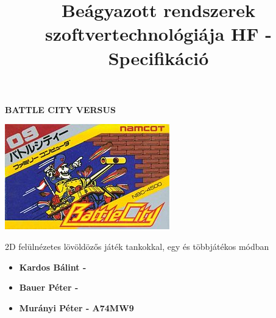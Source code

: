 \documentclass[12pt]{article}
\title{Beágyazott rendszerek szoftvertechnológiája HF - Specifikáció\vspace{-6ex}}
\date{}
\begin{document}
\maketitle

\begin{Huge}
\begin{center}
\textbf{BATTLE CITY VERSUS}
\end{center}
\end{Huge}

\centering
\includegraphics{Battle_City_NES_cover}


2D felülnézetes lövöldözős játék tankokkal, egy és többjátékos módban

\begin{itemize}
\item[] \textbf{Kardos Bálint -} 
\item[] \textbf{Bauer Péter -}
\item[] \textbf{Murányi Péter - A74MW9}
\end{itemize}
\end{document}
